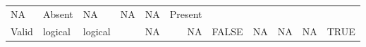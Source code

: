\documentclass[
]{article}
\begin{document}
\begin{longtable}[]{@{}lllrrrlrrrl@{}}
\begin{minipage}[t]{0.05\columnwidth}
NA\strut
\end{minipage} & \begin{minipage}[t]{0.07\columnwidth}\raggedright
Absent\strut
\end{minipage} & \begin{minipage}[t]{0.05\columnwidth}\raggedleft
NA\strut
\end{minipage} & \begin{minipage}[t]{0.05\columnwidth}\raggedleft
NA\strut
\end{minipage} & \begin{minipage}[t]{0.05\columnwidth}\raggedleft
NA\strut
\end{minipage} & \begin{minipage}[t]{0.06\columnwidth}\raggedright
Present\strut
\end{minipage}\tabularnewline
\begin{minipage}[t]{0.10\columnwidth}\raggedright
Valid\strut
\end{minipage} & \begin{minipage}[t]{0.07\columnwidth}\raggedright
logical\strut
\end{minipage} & \begin{minipage}[t]{0.06\columnwidth}\raggedright
logical\strut
\end{minipage} & \begin{minipage}[t]{0.08\columnwidth}\raggedleft
250\strut
\end{minipage} & \begin{minipage}[t]{0.06\columnwidth}\raggedleft
NA\strut
\end{minipage} & \begin{minipage}[t]{0.05\columnwidth}\raggedleft
NA\strut
\end{minipage} & \begin{minipage}[t]{0.07\columnwidth}\raggedright
FALSE\strut
\end{minipage} & \begin{minipage}[t]{0.05\columnwidth}\raggedleft
NA\strut
\end{minipage} & \begin{minipage}[t]{0.05\columnwidth}\raggedleft
NA\strut
\end{minipage} & \begin{minipage}[t]{0.05\columnwidth}\raggedleft
NA\strut
\end{minipage} & \begin{minipage}[t]{0.06\columnwidth}\raggedright
TRUE\strut
\end{minipage}\tabularnewline

\end{longtable}
\end{document}
